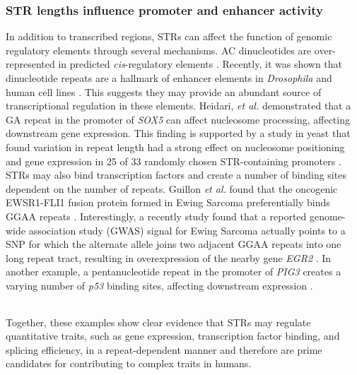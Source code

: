\subsubsection{STR lengths influence promoter and enhancer activity}
In addition to transcribed regions, STRs can affect the function of genomic regulatory elements through several mechanisms. AC dinucleotides are over-represented in predicted \emph{cis}-regulatory elements \cite{RockmanWray2002}. Recently, it was shown that dinucleotide repeats are a hallmark of enhancer elements in \emph{Drosophila} and human cell lines \cite{Yanez-CunaArnoldStampfelEtAl2014}. This suggests they may provide an abundant source of transcriptional regulation in these elements. Heidari, \emph{et al.} \cite{HeidariNarimanSalehFamEsmaeilzadeh-GharehdaghiEtAl2012} demonstrated that a GA repeat in the promoter of \emph{SOX5} can affect nucleosome processing, affecting downstream gene expression. This finding is supported by a study in yeast that found variation in repeat length had a strong effect on nucleosome positioning and gene expression in 25 of 33 randomly chosen STR-containing promoters \cite{VincesLegendreCaldaraEtAl2009}. STRs may also bind transcription factors and create a number of binding sites dependent on the number of repeats. Guillon \emph{et al.} found that the oncogenic EWSR1-FLI1 fusion protein formed in Ewing Sarcoma preferentially binds GGAA repeats \cite{GuillonTirodeBoevaEtAl2009}. Interestingly, a recently study found that a reported genome-wide association study (GWAS) signal for Ewing Sarcoma actually points to a SNP for which the alternate allele joins two adjacent GGAA repeats into one long repeat tract, resulting in overexpression of the nearby gene \emph{EGR2} \cite{GrunewaldBernardGilardi-HebenstreitEtAl2015}. In another example, a pentanucleotide repeat in the promoter of \emph{PIG3} creates a varying number of \emph{p53} binding sites, affecting downstream expression \cite{ContenteDittmerKochEtAl2002}.

\begin{table}
\label{tab:intro2}
\begin{tabular}{c c c c c c}
\hline
\hline
\hline
\end{tabular}
\end{table}

Together, these examples show clear evidence that STRs may regulate quantitative traits, such as gene expression, transcription factor binding, and splicing efficiency, in a repeat-dependent manner and therefore are prime candidates for contributing to complex traits in humans.

